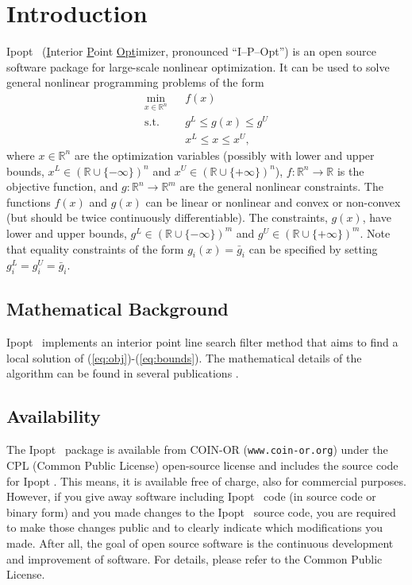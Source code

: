 \documentclass[10pt]{article}
\newcommand{\RR}{{\mathbb{R}}}
\newcommand{\Ipopt}{{\sc Ipopt }}
\begin{document}
\section{Introduction}
\Ipopt\ (\underline{I}nterior \underline{P}oint \underline{Opt}imizer,
pronounced ``I--P--Opt'') is an open source software package for
large-scale nonlinear optimization. It can be used to solve general
nonlinear programming problems of the form
\begin{eqnarray}
\min_{x\in\RR^n} &&f(x) \label{eq:obj} \\
\mbox{s.t.} \;  &&g^L \leq g(x) \leq g^U \\
                &&x^L \leq x \leq x^U, \label{eq:bounds}
\end{eqnarray}
where $x \in \RR^n$ are the optimization variables (possibly with
lower and upper bounds, $x^L\in(\RR\cup\{-\infty\})^n$ and
$x^U\in(\RR\cup\{+\infty\})^n$), $f:\RR^n\longrightarrow\RR$ is the
objective function, and $g:\RR^n\longrightarrow \RR^m$ are the general
nonlinear constraints.  The functions $f(x)$ and $g(x)$ can be linear
or nonlinear and convex or non-convex (but should be twice
continuously differentiable). The constraints, $g(x)$, have lower and
upper bounds, $g^L\in(\RR\cup\{-\infty\})^m$ and
$g^U\in(\RR\cup\{+\infty\})^m$. Note that equality constraints of the
form $g_i(x)=\bar g_i$ can be specified by setting
$g^L_{i}=g^U_{i}=\bar g_i$.

\subsection{Mathematical Background}
\Ipopt\ implements an interior point line search filter method that
aims to find a local solution of (\ref{eq:obj})-(\ref{eq:bounds}).  The
mathematical details of the algorithm can be found in several
publications
\cite{NocWaeWal:adaptive,WaechterPhD,WaecBieg06:mp,WaeBie05:filterglobal,WaeBie05:filterlocal}.

\subsection{Availability}
The \Ipopt\ package is available from COIN-OR
(\texttt{www.coin-or.org}) under the CPL (Common Public License)
open-source license and includes the source code for \Ipopt.  This
means, it is available free of charge, also for commercial purposes.
However, if you give away software including \Ipopt\ code (in source
code or binary form) and you made changes to the \Ipopt\ source code,
you are required to make those changes public and to clearly indicate
which modifications you made.  After all, the goal of open source
software is the continuous development and improvement of software.
For details, please refer to the Common Public License.
\end{document}
